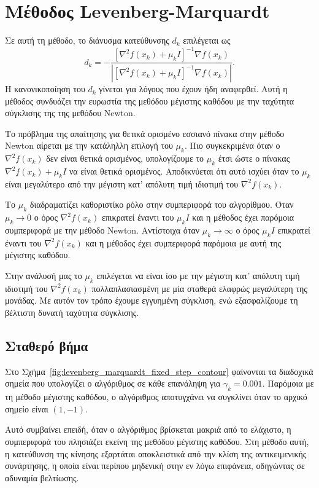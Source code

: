 \documentclass[a4paper,12pt]{article}
\begin{document}
\section*{Μέθοδος  Levenberg-Marquardt}
Σε αυτή τη μέθοδο, το διάνυσμα κατεύθυνσης $d_k$ επιλέγεται ως 
\[d_k = -\frac{[\nabla^2 f(x_k) + \mu_k I]^{-1} \nabla f(x_k)}{|[\nabla^2 f(x_k) + \mu_k I]^{-1} \nabla f(x_k)|}.\]
Η κανονικοποίηση του $d_k$ γίνεται για λόγους που έχουν ήδη αναφερθεί. Αυτή η μέθοδος συνδυάζει την
ευρωστία της μεθόδου μέγιστης καθόδου με την ταχύτητα σύγκλισης της της μεθόδου Newton.

Το πρόβλημα της απαίτησης για θετικά ορισμένο εσσιανό πίνακα στην μέθοδο
Newton αίρεται με την κατάληλλη επιλογή του $\mu_k$. Πιο συγκεκριμένα όταν ο $\nabla^2 f(x_k)$ 
δεν είναι θετικά ορισμένος, υπολογίζουμε το $\mu_k$ έτσι ώστε ο πίνακας $\nabla^2 f(x_k) + \mu_k I$ να είναι θετικά 
ορισμένος. Αποδικνύεται ότι αυτό ισχύει όταν το $\mu_k$ είναι μεγαλύτερο από την μέγιστη κατ' απόλυτη τιμή ιδιοτιμή του
$\nabla^2 f(x_k)$. 

Το $\mu_k$ διαδραματίζει καθοριστίκο ρόλο στην συμπεριφορά του αλγορίθμου. Όταν $\mu_k \to 0$ 
ο όρος $\nabla^2 f(x_k)$ επικρατεί έναντι του $\mu_k I$ και η μέθοδος έχει παρόμοια συμπεριφορά με την μέθοδο 
Newton. Αντίστοιχα όταν $\mu_k \to \infty$ ο όρος $\mu_k I$ επικρατεί
έναντι του $\nabla^2 f(x_k)$ και η μέθοδος έχει συμπεριφορά παρόμοια με αυτή της μέγιστης καθόδου. 

Στην ανάλυσή μας το $\mu_k$ επιλέγεται να είναι ίσο με την μέγιστη κατ' απόλυτη τιμή ιδιοτιμή του $\nabla^2 f(x_k)$ 
πολλαπλασιασμένη με μία σταθερά ελαφρώς μεγαλύτερη της μονάδας. Με αυτόν τον τρόπο έχουμε εγγυημένη σύγκλιση, 
ενώ εξασφαλίζουμε τη βέλτιστη δυνατή ταχύτητα σύγκλισης.

\subsection*{Σταθερό βήμα}
Στο Σχήμα~\ref{fig:levenberg_marquardt_fixed_step_contour} φαίνονται τα διαδοχικά σημεία που υπολογίζει ο αλγόριθμος σε 
κάθε επανάληψη για $\gamma_k = 0.001$. Παρόμοια με τη μέθοδο μέγιστης καθόδου, ο αλγόριθμος αποτυγχάνει να συγκλίνει
όταν το αρχικό σημείο είναι $(1, -1)$. 

Αυτό συμβαίνει επειδή, όταν ο αλγόριθμος βρίσκεται μακριά από το ελάχιστο, η συμπεριφορά του πλησιάζει εκείνη της
μεθόδου μέγιστης καθόδου. Στη μέθοδο αυτή, η κατεύθυνση της κίνησης εξαρτάται αποκλειστικά από την κλίση της
αντικειμενικής συνάρτησης, η οποία είναι περίπου μηδενική στην εν λόγω επιφάνεια, οδηγώντας σε αδυναμία βελτίωσης.
\end{document}
